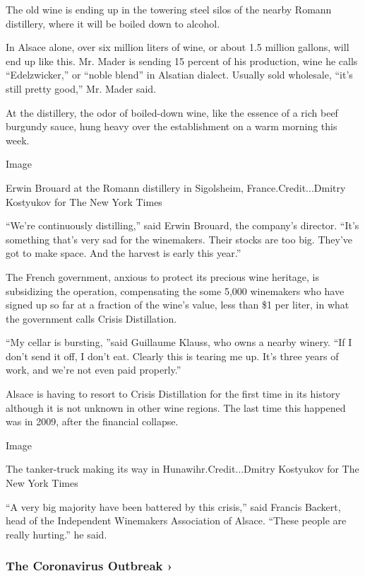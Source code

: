 The old wine is ending up in the towering steel silos of the nearby
Romann distillery, where it will be boiled down to alcohol.

In Alsace alone, over six million liters of wine, or about 1.5 million
gallons, will end up like this. Mr. Mader is sending 15 percent of his
production, wine he calls ``Edelzwicker,'' or ``noble blend'' in
Alsatian dialect. Usually sold wholesale, ``it's still pretty good,''
Mr. Mader said.

At the distillery, the odor of boiled-down wine, like the essence of a
rich beef burgundy sauce, hung heavy over the establishment on a warm
morning this week.

Image

Erwin Brouard at the Romann distillery in Sigolsheim,
France.Credit...Dmitry Kostyukov for The New York Times

``We're continuously distilling,'' said Erwin Brouard, the company's
director. ``It's something that's very sad for the winemakers. Their
stocks are too big. They've got to make space. And the harvest is early
this year.''

The French government, anxious to protect its precious wine heritage, is
subsidizing the operation, compensating the some 5,000 winemakers who
have signed up so far at a fraction of the wine's value, less than \$1
per liter, in what the government calls Crisis Distillation.

``My cellar is bursting, ''said Guillaume Klauss, who owns a nearby
winery. ``If I don't send it off, I don't eat. Clearly this is tearing
me up. It's three years of work, and we're not even paid properly.''

Alsace is having to resort to Crisis Distillation for the first time in
its history although it is not unknown in other wine regions. The last
time this happened was in 2009, after the financial collapse.

Image

The tanker-truck making its way in Hunawihr.Credit...Dmitry Kostyukov
for The New York Times

``A very big majority have been battered by this crisis,'' said Francis
Backert, head of the Independent Winemakers Association of Alsace.
``These people are really hurting.'' he said.

\href{https://www.nytimes3xbfgragh.onion/news-event/coronavirus?action=click\&pgtype=Article\&state=default\&region=MAIN_CONTENT_3\&context=storylines_faq}{}

\hypertarget{the-coronavirus-outbreak-}{%
\subsubsection{The Coronavirus Outbreak
›}\label{the-coronavirus-outbreak-}}

